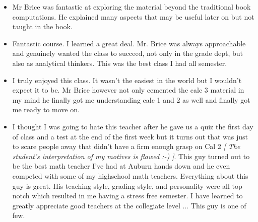 \documentclass[11pt]{article}
\begin{document}
	\begin{itemize}
	
		\item{} Mr Brice was fantastic at exploring the material beyond the traditional book computations. He explained many aspects that may be useful later on but not taught in the book.
		
		\item{} Fantastic course. I learned a great deal. Mr. Brice was always approachable and genuinely wanted the class to succeed, not only in the grade dept, but also as analytical thinkers. This was the best class I had all semester.
	
		\item{} I truly enjoyed this class. It wasn't the easiest in the world but I wouldn't expect it to be. Mr Brice however not only cemented the calc 3 material in my mind he finally got me understanding calc 1 and 2 as well and finally got me ready to move on.
		
		\item{} I thought I was going to hate this teacher after he gave us a quiz the first day of class and a test at the end of the first week but it turns out that was just to scare people away that didn't have a firm enough grasp on Cal 2 \emph{[ The student's interpretation of my motives is flawed :-) ]}. This guy turned out to be the best math teacher I've had at Auburn hands down and he even competed with some of my highschool math teachers. Everything about this guy is great. His teaching style, grading style, and personality were all top notch which resulted in me having a stress free semester. I have learned to greatly appreciate good teachers at the collegiate level ... %
		This guy is one of few.
	\end{itemize}
\end{document}
